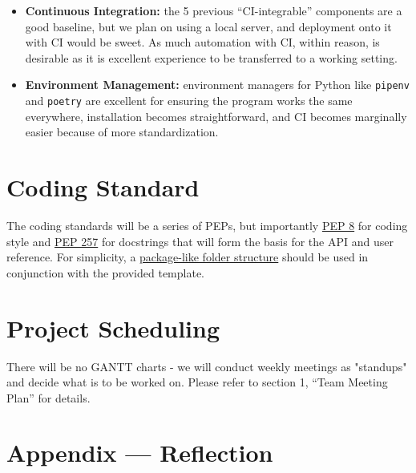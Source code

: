 \documentclass{article}
\begin{document}
\begin{itemize}
    \item \textbf{Continuous Integration:} the 5 previous ``CI-integrable'' components are a good baseline, but we plan on using a local server, and deployment onto it with CI would be sweet. As much automation with CI, within reason, is desirable as it is excellent experience to be transferred to a working setting.
    \item \textbf{Environment Management:} environment managers for Python like \texttt{pipenv} and \texttt{poetry} are excellent for ensuring the program works the same everywhere, installation becomes straightforward, and CI becomes marginally easier because of more standardization.
\end{itemize}


\section{Coding Standard}
The coding standards will be a series of PEPs, but importantly \href{https://peps.python.org/pep-0008/}{PEP 8} for coding style and \href{https://peps.python.org/pep-0257/}{PEP 257} for docstrings that will form the basis for the API and user reference. For simplicity, a \href{https://stackoverflow.com/a/69842362}{package-like folder structure} should be used in conjunction with the provided template.

\section{Project Scheduling}
There will be no GANTT charts - we will conduct weekly meetings as "standups" and decide what is to be worked on. Please refer to section 1, ``Team Meeting Plan'' for details.

\newpage{}

\section*{Appendix --- Reflection}


\end{document}
